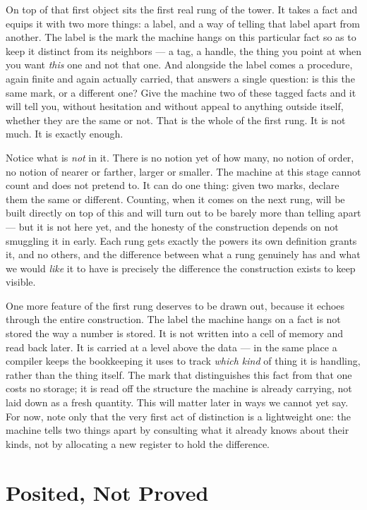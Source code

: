On top of that first object sits the first real rung of the tower. It takes a
fact and equips it with two more things: a label, and a way of telling that label apart from another. The label
is the mark the machine hangs on this particular fact so as to keep it distinct from its neighbors --- a tag, a
handle, the thing you point at when you want \emph{this} one and not that one. And alongside the label comes a
procedure, again finite and again actually carried, that answers a single question: is this the same mark, or a
different one? Give the machine two of these tagged facts and it will tell you, without hesitation and without
appeal to anything outside itself, whether they are the same or not. That is the whole of the first rung. It is
not much. It is exactly enough.

Notice what is \emph{not} in it. There is no notion yet of how many, no notion of order, no notion of nearer or
farther, larger or smaller. The machine at this stage cannot count and does not pretend to. It can do one thing:
given two marks, declare them the same or different. Counting, when it comes on the next rung, will be built
directly on top of this and will turn out to be barely more than telling apart --- but it is not here yet, and
the honesty of the construction depends on not smuggling it in early. Each rung gets exactly the powers its own
definition grants it, and no others, and the difference between what a rung genuinely has and what we would
\emph{like} it to have is precisely the difference the construction exists to keep visible.

One more feature of the first rung deserves to be drawn out, because it echoes through the entire construction. The
label the machine hangs on a fact is not stored the way a number is stored. It is not written into a cell of
memory and read back later. It is carried at a level above the data --- in the same place a compiler keeps the
bookkeeping it uses to track \emph{which kind} of thing it is handling, rather than the thing itself. The mark
that distinguishes this fact from that one costs no storage; it is read off the structure the machine is already
carrying, not laid down as a fresh quantity. This will matter later in ways we cannot yet say. For now, note only
that the very first act of distinction is a lightweight one: the machine tells two things apart by consulting
what it already knows about their kinds, not by allocating a new register to hold the difference.

\section{Posited, Not Proved}

